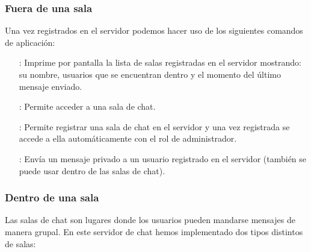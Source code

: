 \subsubsection{Fuera de una sala}
Una vez registrados en el servidor podemos hacer uso de los siguientes comandos de aplicación:
\begin{itemize}[align=left]
    \item [\comm{roomlist}:] Imprime por pantalla la lista de salas registradas en el servidor mostrando: su nombre, usuarios que se encuentran  dentro y el momento del último mensaje enviado.
    \item [\comm{enter <nombre de la sala>}:] Permite acceder a una sala de chat.
    \item [\comm{create <nombre de la sala>}:] Permite registrar una sala de chat en el servidor y una vez registrada se accede a ella automáticamente con el rol de administrador.
    \item [\comm{dm <usuario> {} <mensaje>}:] Envía un mensaje privado a un usuario registrado en el servidor (también se puede usar dentro de las salas de chat). 
\end{itemize}

\subsubsection{Dentro de una sala}
Las salas de chat son lugares donde los usuarios pueden mandarse mensajes de manera grupal. En este servidor de chat hemos implementado dos tipos distintos de salas:


